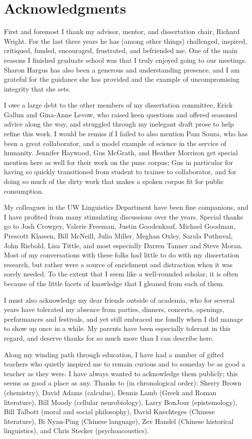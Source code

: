 \chapter*{Acknowledgments}
First and foremost I thank my advisor, mentor, and dissertation chair, Richard Wright.  For the last three years he has (among other things) challenged, inspired, critiqued, funded, encouraged, frustrated, and befriended me.  One of the main reasons I finished graduate school was that I truly enjoyed going to our meetings.  Sharon Hargus has also been a generous and understanding presence, and I am grateful for the guidance she has provided and the example of uncompromising integrity that she sets.

I owe a large debt to the other members of my dissertation committee, Erick Gallun and Gina-Anne Levow, who raised keen questions and offered seasoned advice along the way, and struggled through my inelegant draft prose to help refine this work.  I would be remiss if I failed to also mention Pam Souza, who has been a great collaborator, and a model example of science in the service of humanity.  Jennifer Haywood, Gus McGrath, and Heather Morrison get special mention here as well for their work on the \ac{pnnc} corpus; Gus in particular for having so quickly transitioned from student to trainee to collaborator, and for doing so much of the dirty work that makes a spoken corpus fit for public consumption.

My colleagues in the UW Linguistics Department have been fine companions, and I have profited from many stimulating discussions over the years.  Special thanks go to Josh Crowgey, Valerie Freeman, Justin Goodenkauf, Michael Goodman, Prescott Klassen, Bill McNeill, Julia Miller, Meghan Oxley, Sarala Puthuval, John Riebold, Lisa Tittle, and most especially Darren Tanner and Steve Moran.  Most of my conversations with these folks had little to do with my dissertation research, but rather were a source of enrichment and distraction when it was sorely needed.  To the extent that I seem like a well-rounded scholar, it is often because of the little facets of knowledge that I gleaned from each of them.  

I must also acknowledge my dear friends outside of academia, who for several years have tolerated my absence from parties, dinners, concerts, openings, performances and festivals, and yet still embraced me fondly when I did manage to show up once in a while.  My parents have been especially tolerant in this regard, and deserve thanks for so much more than I can describe here.

Along my winding path through education, I have had a number of gifted teachers who quietly inspired me to remain curious and to someday be as good a teacher as they were.  I have always wanted to acknowledge them publicly; this seems as good a place as any.  Thanks to (in chronological order): Sherry Brown (chemistry), David Adams (calculus), Dennis Lamb (Greek and Roman literature), Bill Moody (cellular neurobiology), Larry BonJour (epistemology), Bill Talbott (moral and social philosophy), David Knechteges (Chinese literature), Bi Nyan-Ping (Chinese language), Zev Handel (Chinese historical linguistics), and Chris Stecker (psychoacoustics).
